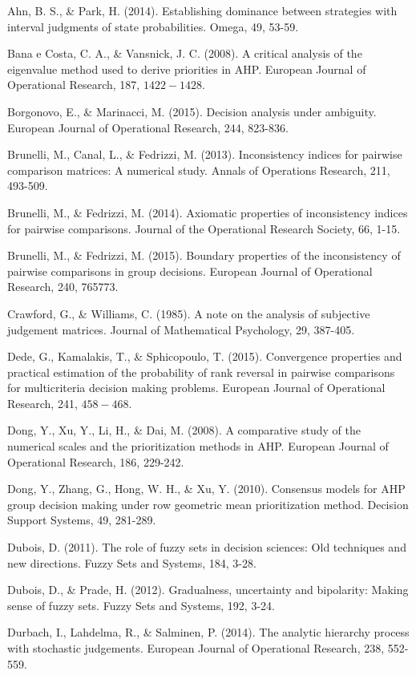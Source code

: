\documentclass[10pt]{article}
\begin{document}
Ahn, B. S., \& Park, H. (2014). Establishing dominance between strategies with interval judgments of state probabilities. Omega, 49, 53-59.

Bana e Costa, C. A., \& Vansnick, J. C. (2008). A critical analysis of the eigenvalue method used to derive priorities in AHP. European Journal of Operational Research, 187, $1422-1428$.

Borgonovo, E., \& Marinacci, M. (2015). Decision analysis under ambiguity. European Journal of Operational Research, 244, 823-836.

Brunelli, M., Canal, L., \& Fedrizzi, M. (2013). Inconsistency indices for pairwise comparison matrices: A numerical study. Annals of Operations Research, 211, 493-509.

Brunelli, M., \& Fedrizzi, M. (2014). Axiomatic properties of inconsistency indices for pairwise comparisons. Journal of the Operational Research Society, 66, 1-15.

Brunelli, M., \& Fedrizzi, M. (2015). Boundary properties of the inconsistency of pairwise comparisons in group decisions. European Journal of Operational Research, 240, 765773.

Crawford, G., \& Williams, C. (1985). A note on the analysis of subjective judgement matrices. Journal of Mathematical Psychology, 29, 387-405.

Dede, G., Kamalakis, T., \& Sphicopoulo, T. (2015). Convergence properties and practical estimation of the probability of rank reversal in pairwise comparisons for multicriteria decision making problems. European Journal of Operational Research, 241, $458-468$.

Dong, Y., Xu, Y., Li, H., \& Dai, M. (2008). A comparative study of the numerical scales and the prioritization methods in AHP. European Journal of Operational Research, 186, 229-242.

Dong, Y., Zhang, G., Hong, W. H., \& Xu, Y. (2010). Consensus models for AHP group decision making under row geometric mean prioritization method. Decision Support Systems, 49, 281-289.

Dubois, D. (2011). The role of fuzzy sets in decision sciences: Old techniques and new directions. Fuzzy Sets and Systems, 184, 3-28.

Dubois, D., \& Prade, H. (2012). Gradualness, uncertainty and bipolarity: Making sense of fuzzy sets. Fuzzy Sets and Systems, 192, 3-24.

Durbach, I., Lahdelma, R., \& Salminen, P. (2014). The analytic hierarchy process with stochastic judgements. European Journal of Operational Research, 238, 552-559.
\end{document}

